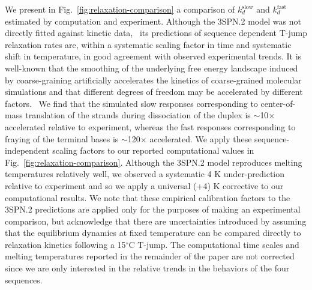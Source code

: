 \documentclass[journal=jpcbfk,manuscript=article]{achemso}
\newcommand*{\rood}[1]{{\color{red}{#1}}}
\begin{document}
We present in Fig.~\ref{fig:relaxation-comparison} a comparison of $k_d^\mathrm{slow}$ and $k_d^\mathrm{fast}$ estimated by computation and experiment. Although the 3SPN.2 model was not directly fitted against kinetic data,~\cite{Hinckley2013AnHybridization} its predictions of sequence dependent T-jump relaxation rates are, within a systematic scaling factor in time and systematic shift in temperature, in good agreement with observed experimental trends. It is well-known that the smoothing of the underlying free energy landscape induced by coarse-graining artificially accelerates the kinetics of coarse-grained molecular simulations and that different degrees of freedom may be accelerated by different factors.~\citep{Marrink2007TheSimulations, Fritz2011MultiscaleDynamics, Marrink2013PerspectiveModel} We find that the simulated slow responses corresponding to center-of-mass translation of the strands during dissociation of the duplex is $\sim$10$\times$ accelerated relative to experiment, whereas the fast responses corresponding to fraying of the terminal bases is $\sim$120$\times$ accelerated. We apply these sequence-independent scaling factors to our reported computational values in Fig.~\ref{fig:relaxation-comparison}. Although the 3SPN.2 model reproduces melting temperatures relatively well, we observed a systematic 4 K under-prediction relative to experiment and so we apply a universal (+4) K corrective \rood{temperature shift} to our computational results. We note that these empirical calibration factors to the 3SPN.2 predictions are applied only for the purposes of making an experimental comparison, but acknowledge that there are uncertainties introduced by assuming that the equilibrium dynamics at fixed temperature can be compared directly to relaxation kinetics following a 15$^\circ$C T-jump. The computational time scales and melting temperatures reported in the remainder of the paper are not corrected \rood{by these calibration corrections or finite-size fluctuation corrections} since we are only interested in the relative trends in the behaviors of the four sequences.
\end{document}
